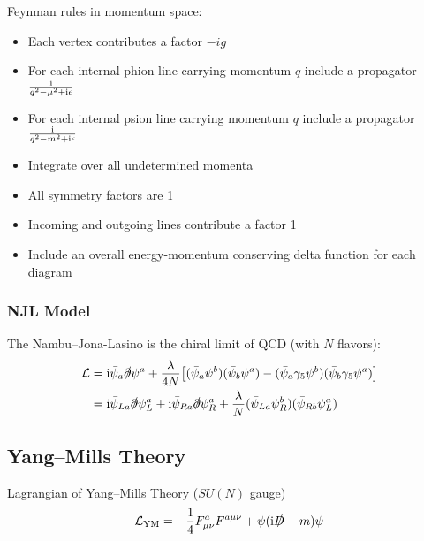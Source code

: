 			\noindent
			Feynman rules in momentum space:
			\begin{itemize}\itemsep -0pt
				\item Each vertex contributes a factor $-ig$
				\item For each internal phion line carrying momentum $q$ include a propagator $\frac{\mathrm{i}}{q^2 -\mu^2+\mathrm{i}\epsilon}$
				\item For each internal psion line carrying momentum $q$ include a
					propagator $\frac{\mathrm{i}}{q^2 -m^2+\mathrm{i}\epsilon}$
				\item Integrate over all undetermined momenta
				\item All symmetry factors are 1
				\item Incoming and outgoing lines contribute a factor 1
				\item Include an overall energy-momentum conserving delta function
					for each diagram
			\end{itemize}



		\subsubsection{NJL Model}
			The Nambu--Jona-Lasino is the chiral limit of QCD (with $N$ flavors):
			\begin{equation}
				\begin{aligned}
					\mathcal{L}
					&= \mathrm{i} \bar{\psi}_a \slashed{\partial} \psi^a + \frac{\lambda}{4 N} \qty[(\bar{\psi}_a\psi^b)(\bar{\psi}_b\psi^a) - (\bar{\psi}_a\gamma_5 \psi^b) (\bar{\psi}_b\gamma_5 \psi^a)] \\
					&= \mathrm{i} \bar{\psi}_{La} \slashed{\partial} \psi_L^a + \mathrm{i} \bar{\psi}_{Ra} \slashed{\partial} \psi_R^a + \frac{\lambda}{N} (\bar{\psi}_{La}\psi_R^b)(\bar{\psi}_{Rb}\psi_L^a)
				\end{aligned}
			\end{equation}

	\subsection{Yang--Mills Theory}
		Lagrangian of Yang--Mills Theory ($SU(N)$ gauge)
		\begin{equation}
			\mathcal{L}_\text{YM} = -\frac{1}{4} F^a_{\mu\nu} F^{a\mu\nu} + \bar{\psi}(\mathrm{i}\slashed{D}-m)\psi
		\end{equation}

